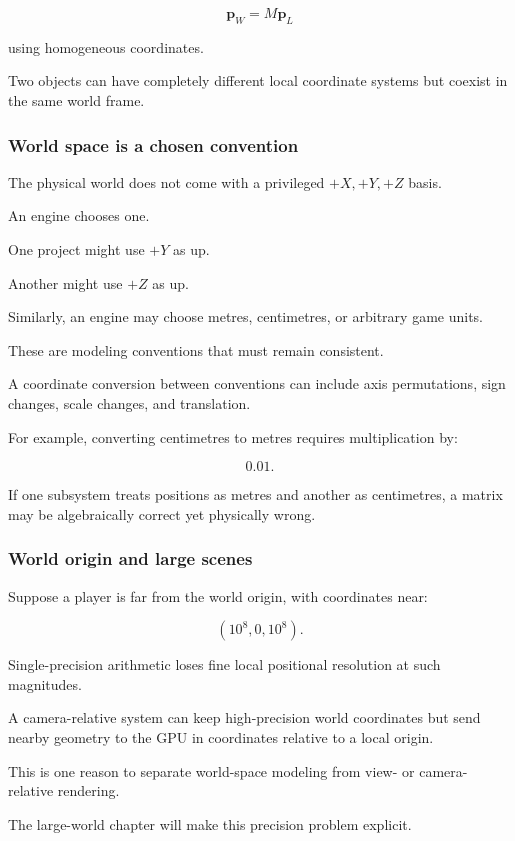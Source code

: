 \[
 \mathbf p_W=M\mathbf p_L
\]

using homogeneous coordinates.

Two objects can have completely different local coordinate systems but coexist in the same world frame.

\subsubsection{World space is a chosen convention}\label{world-space-is-a-chosen-convention}

The physical world does not come with a privileged \(+X,+Y,+Z\) basis.

An engine chooses one.

One project might use \(+Y\) as up.

Another might use \(+Z\) as up.

Similarly, an engine may choose metres, centimetres, or arbitrary game units.

These are modeling conventions that must remain consistent.

A coordinate conversion between conventions can include axis permutations, sign changes, scale changes, and translation.

For example, converting centimetres to metres requires multiplication by:

\[
 0.01.
\]

If one subsystem treats positions as metres and another as centimetres, a matrix may be algebraically correct yet physically wrong.

\subsubsection{World origin and large scenes}\label{world-origin-and-large-scenes}

Suppose a player is far from the world origin, with coordinates near:

\[
 (10^8,0,10^8).
\]

Single-precision arithmetic loses fine local positional resolution at such magnitudes.

A camera-relative system can keep high-precision world coordinates but send nearby geometry to the GPU in coordinates relative to a local origin.

This is one reason to separate world-space modeling from view- or camera-relative rendering.

The large-world chapter will make this precision problem explicit.

